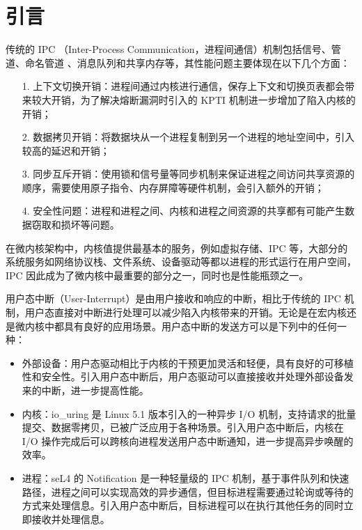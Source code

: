 
\chapter{引言}

传统的 IPC （Inter-Process Communication，进程间通信）机制包括信号、管道、命名管道 、消息队列和共享内存等\cite{modernos}，其性能问题主要体现在以下几个方面：

\begin{itemize}
    \item[1.] 上下文切换开销：进程间通过内核进行通信，保存上下文和切换页表都会带来较大开销，为了解决熔断漏洞时引入的 KPTI 机制进一步增加了陷入内核的开销\cite{kpti}；
    \item[2.] 数据拷贝开销：将数据块从一个进程复制到另一个进程的地址空间中，引入较高的延迟和开销；
    \item[3.] 同步互斥开销：使用锁和信号量等同步机制来保证进程之间访问共享资源的顺序，需要使用原子指令、内存屏障等硬件机制，会引入额外的开销；
    \item[4.] 安全性问题：进程和进程之间、内核和进程之间资源的共享都有可能产生数据窃取和损坏等问题。
\end{itemize}

在微内核架构中，内核值提供最基本的服务，例如虚拟存储、IPC 等，大部分的系统服务如网络协议栈、文件系统、设备驱动等都以进程的形式运行在用户空间\cite{microkernel}，IPC 因此成为了微内核中最重要的部分之一，同时也是性能瓶颈之一。

用户态中断（User-Interrupt）是由用户接收和响应的中断，相比于传统的 IPC 机制，用户态直接对中断进行处理可以减少陷入内核带来的开销。无论是在宏内核还是微内核中都具有良好的应用场景。用户态中断的发送方可以是下列中的任何一种：

\begin{itemize}
    \item 外部设备：用户态驱动\cite{userdriver}相比于内核的干预更加灵活和轻便，具有良好的可移植性和安全性。引入用户态中断后，用户态驱动可以直接接收并处理外部设备发来的中断，进一步提高性能。
    \item 内核：io\_uring \cite{iouring}是 Linux 5.1 版本引入的一种异步 I/O 机制，支持请求的批量提交、数据零拷贝，已被广泛应用于各种场景。引入用户态中断后，内核在 I/O 操作完成后可以跨核向进程发送用户态中断通知，进一步提高异步唤醒的效率。
    \item 进程：seL4 的 Notification \cite{sel4}是一种轻量级的 IPC 机制，基于事件队列和快速路径，进程之间可以实现高效的异步通信，但目标进程需要通过轮询或等待的方式来处理信息。引入用户态中断后，目标进程可以在执行其他任务的同时立即接收并处理信息。
\end{itemize}

